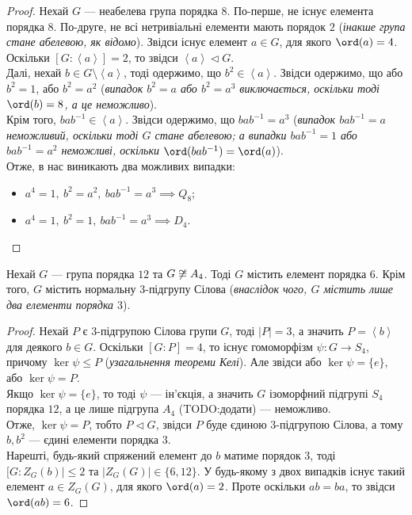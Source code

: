 \documentclass{math_library}
\begin{document}
\begin{proof}
Нехай $G$ --- неабелева група порядка $8$. По-перше, не існує елемента порядка $8$. По-друге, не всі нетривіальні елементи мають порядок $2$ (\textit{інакше група стане абелевою, як відомо}). Звідси існує елемент $a \in G$, для якого $\ord(a) = 4$.\\
Оскільки $[G:\left<a\right>] = 2$, то звідси $\left<a\right> \triangleleft G$. \\
Далі, нехай $b \in G \setminus \left<a\right>$, тоді одержимо, що $b^2 \in \left<a\right>$. Звідси одержимо, що або $b^2 = 1$, або $b^2 = a^2$ (\textit{випадок $b^2 = a$ або $b^2 = a^3$ виключається, оскільки тоді $\ord(b) = 8$, а це неможливо}).\\
Крім того, $bab^{-1} \in \left<a\right>$. Звідси одержимо, що $bab^{-1} = a^3$ (\textit{випадок $bab^{-1} = a$ неможливий, оскільки тоді $G$ стане абелевою; а випадки $bab^{-1} = 1$ або $bab^{-1} = a^2$ неможливі, оскільки $\ord(bab^{-1}) = \ord(a)$}).\\
Отже, в нас виникають два можливих випадки:
\begin{itemize}[nosep]
\item $a^4 = 1,\ b^2 = a^2,\ bab^{-1} = a^3 \implies Q_8$;
\item $a^4 = 1,\ b^2 = 1,\ bab^{-1} = a^3 \implies D_4$. \qedhere
\end{itemize}
\end{proof}

\begin{lemma}
Нехай $G$ --- група порядка $12$ та $G \centernot\cong A_4$. Тоді $G$ містить елемент порядка $6$. Крім того, $G$ містить нормальну $3$-підгрупу Сілова (\textit{внаслідок чого, $G$ містить лише два елементи порядка $3$}).
\end{lemma}

\begin{proof}
Нехай $P$ є $3$-підгрупою Сілова групи $G$, тоді $|P| = 3$, а значить $P = \left<b\right>$ для деякого $b \in G$. Оскільки $[G:P] = 4$, то існує гомоморфізм $\psi \colon G \to S_4$, причому $\ker \psi \leq P$ (\textit{узагальнення теореми Келі}). Але звідси або $\ker \psi = \{e\}$, або $\ker \psi = P$.\\
Якщо $\ker \psi = \{e\}$, то тоді $\psi$ --- ін'єкція, а значить $G$ ізоморфний підгрупі $S_4$ порядка $12$, а це лише підгрупа $A_4$ (TODO:додати) --- неможливо.\\
Отже, $\ker \psi = P$, тобто $P \triangleleft G$, звідси $P$ буде єдиною $3$-підгрупою Сілова, а тому $b,b^2$ --- єдині елементи порядка $3$.\\
Нарешті, будь-який спряжений елемент до $b$ матиме порядок $3$, тоді $[G:Z_G(b)| \leq 2$ та $|Z_G(G)| \in \{6,12\}$. У будь-якому з двох випадків існує такий елемент $a \in Z_G(G)$, для якого $\ord(a) = 2$. Проте оскільки $ab = ba$, то звідси $\ord(ab) = 6$.
\end{proof}
\end{document}
